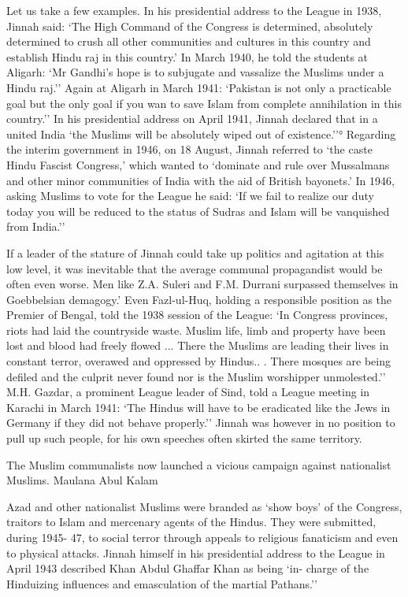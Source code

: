 \begin{multicols}{2}
Let us take a few examples. In his presidential address to the League in 1938, Jinnah said: `The High Command of the Congress is determined, absolutely determined to crush all other communities and cultures in this country and establish Hindu raj in this country.' In March 1940, he told the students at Aligarh: `Mr Gandhi's hope is to subjugate and vassalize the Muslims under a Hindu raj.'' Again at Aligarh in March 1941: `Pakistan is not only a practicable goal but the only goal if you wan to save Islam from complete annihilation in this country.'' In his presidential address on April 1941, Jinnah declared that in a united India `the Muslims will be absolutely wiped out of existence.''° Regarding the interim government in 1946, on 18 August, Jinnah referred to `the caste Hindu Fascist Congress,' which wanted to `dominate and rule over Mussalmans and other minor communities of India with the aid of British bayonets.' In 1946, asking Muslims to vote for the League he said: `If we fail to realize our duty today you will be reduced to the status of Sudras and Islam will be vanquished from India.'' 

If a leader of the stature of Jinnah could take up politics and agitation at this low level, it was inevitable that the average communal propagandist would be often even worse. Men like Z.A. Suleri and F.M. Durrani surpassed themselves in Goebbelsian demagogy.' Even Fazl-ul-Huq, holding a responsible position as the Premier of Bengal, told the 1938 session of the League: `In Congress provinces, riots had laid the countryside waste. Muslim life, limb and property have been lost and blood had freely flowed ... There the Muslims are leading their lives in constant terror, overawed and oppressed by Hindus.. . There mosques are being defiled and the culprit never found nor is the Muslim worshipper unmolested.'' M.H. Gazdar, a prominent League leader of Sind, told a League meeting in Karachi in March 1941: `The Hindus will have to be eradicated like the Jews in Germany if they did not behave properly.'' Jinnah was however in no position to pull up such people, for his own speeches often skirted the same territory. 

The Muslim communalists now launched a vicious campaign against nationalist Muslims. Maulana Abul Kalam 

Azad and other nationalist Muslims were branded as `show boys' of the Congress, traitors to Islam and mercenary agents of the Hindus. They were submitted, during 1945- 47, to social terror through appeals to religious fanaticism and even to physical attacks. Jinnah himself in his presidential address to the League in April 1943 described Khan Abdul Ghaffar Khan as being `in- charge of the Hinduizing influences and emasculation of the martial Pathans.'' 


\end{multicols}
